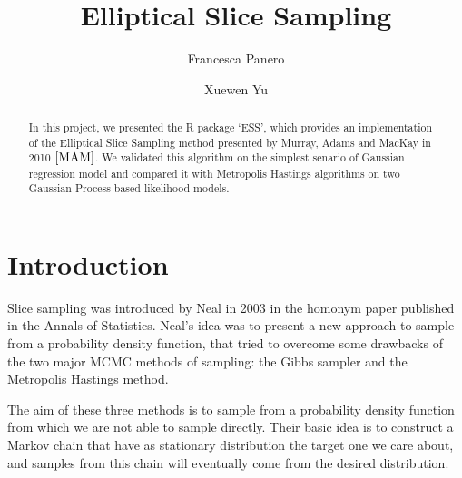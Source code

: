 \documentclass{article}
\title{Elliptical Slice Sampling}
\author{Francesca Panero \and Xuewen Yu}
\begin{document}


\maketitle

\begin{abstract}
In this project, we presented the R package `ESS', which provides an implementation of the Elliptical Slice Sampling method presented by Murray, Adams and MacKay in 2010 $\cite{MAM}$. We validated this algorithm on the simplest senario of Gaussian regression model and compared it with Metropolis Hastings algorithms on two Gaussian Process based likelihood models.
\end{abstract}

\section{Introduction}

Slice sampling was introduced by Neal in 2003 \cite{Neal2003} in the homonym paper published in the Annals of Statistics. Neal's idea was to present a new approach to sample from a probability density function, that tried to overcome some drawbacks of the two major MCMC methods of sampling: the Gibbs sampler and the Metropolis Hastings method.

The aim of these three methods is to sample from a probability density function from which we are not able to sample directly. Their basic idea is to construct a Markov chain that have as stationary distribution the target one we care about, and samples from this chain will eventually come from the desired distribution. 

\end{document}
